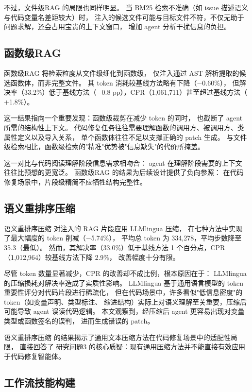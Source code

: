 不过，文件级RAG 的局限也同样明显。
当 BM25 检索不准确（如 issue 描述语义与代码变量名差距较大）时，
注入的候选文件可能与目标文件不符，不仅无助于问题求解，还会占用宝贵的上下文窗口，
增加 agent 分析干扰信息的负担。

\subsection{函数级RAG}
\label{subsec:analysis-rag-function}

函数级RAG 将检索粒度从文件级细化到函数级，
仅注入通过 AST 解析提取的候选函数体，而非完整文件。
其 token 消耗较基线方法略有下降（$-$0.60\%），
但解决率（33.2\%）低于基线方法（$-$0.8 pp），CPR（1,061,711）甚至超过基线方法（$+$1.8\%）。

这一结果指向一个重要发现：函数级裁剪在减少 token 的同时，
也截断了 agent 所需的结构性上下文。
代码修复任务往往需要理解函数的调用方、被调用方、类属性定义以及导入关系，
单个函数体往往不足以支撑正确的 patch 生成。
与文件级检索相比，函数级检索的"精准"优势被"信息缺失"的代价所掩盖。

这一对比与代码阅读理解阶段信息需求相吻合：
agent 在理解阶段需要的上下文往往比预想的更宽泛。
函数级RAG 的结果为后续设计提供了负向参照：
在代码修复场景中，片段级精简不应牺牲结构完整性。

\subsection{语义重排序压缩}
\label{subsec:analysis-llmlingua}

语义重排序压缩 对注入的 RAG 片段应用 LLMlingua 压缩，
在七种方法中实现了最大幅度的 token 削减（$-$5.74\%），
平均总 token 为 334,278，平均步数降至 35.3（最低）。
然而，其解决率（33.0\%）低于基线方法 1 个百分点，CPR（1,012,964）较基线方法下降 2.9\%，
改善幅度十分有限。

尽管 token 数量显著减少，CPR 的改善却不成比例，根本原因在于：
LLMlingua 的压缩损耗对解决率造成了实质性影响。
LLMlingua 基于通用语言模型的 token 重要性评分对代码片段进行稀疏化，
但在代码场景中，许多看似"低信息密度"的 token（如变量声明、类型标注、
缩进结构）实际上对语义理解至关重要，压缩后可能导致 agent 误读代码逻辑。
本文观察到，经压缩后 agent 更容易出现对变量类型或函数签名的误判，
进而生成错误的 patch。

语义重排序压缩 的结果揭示了通用文本压缩方法在代码修复场景中的适配性局限，
直接回答了 研究问题3 的核心质疑：现有通用压缩方法并不能直接有效应用于代码修复智能体。

\subsection{工作流技能构建}
\label{subsec:analysis-skill-abstraction}

